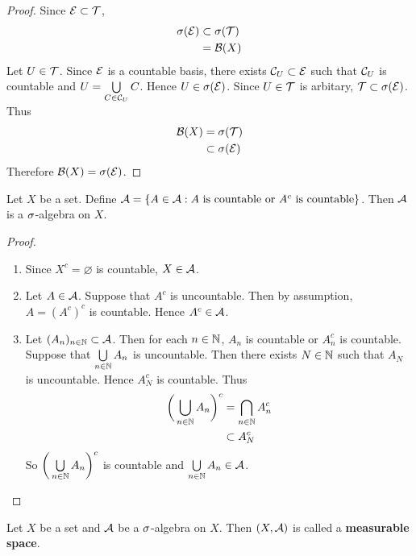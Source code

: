 \documentclass{book}
\begin{document}
	\begin{proof}
		Since $\mathcal{E} \subset \mathcal{T}$, 
		\begin{align*}
			\sigma(\mathcal{E})
			& \subset \sigma(\mathcal{T}) \\
			& = \mathcal{B}(X)
		\end{align*}
		Let $U \in \mathcal{T}$. Since $\mathcal{E}$ is a countable basis, there exists $\mathcal{C}_U \subset \mathcal{E}$ such that $\mathcal{C}_U$ is countable and $U = \bigcup\limits_{C \in \mathcal{C}_U}C$. Hence $U \in \sigma(\mathcal{E})$. Since $U \in \mathcal{T}$ is arbitary, $\mathcal{T} \subset \sigma(\mathcal{E})$. Thus 
		\begin{align*}
			\mathcal{B}(X) 
			& = \sigma(\mathcal{T}) \\
			& \subset \sigma(\mathcal{E})
		\end{align*} 
		Therefore $\mathcal{B}(X) = \sigma(\mathcal{E})$.
	\end{proof}
	
	\begin{ex}  
		Let $X$ be a set. Define $\mathcal{A} = \{A \in \mathcal{A}: A \text{ is countable or }A^c  \text{ is countable}\}$. Then $\mathcal{A}$ is a $\sigma$-algebra on $X$.
	\end{ex}
	
	\begin{proof}\
		\begin{enumerate}
			\item Since $X^c = \varnothing$ is countable, $X \in \mathcal{A}$.
			\item Let $A \in \mathcal{A}$. Suppose that $A^c$ is  uncountable. Then by assumption, $A = (A^c)^c$ is countable. Hence $A^c \in \mathcal{A}$.
			\item Let $(A_n)_{n \in \mathbb{N}} \subset \mathcal{A}$. Then for each $n \in \mathbb{N}$, $A_n$ is countable or $A_n^c$ is countable. Suppose that $\bigcup\limits_{n \in \mathbb{N}}A_n$ is uncountable. Then there exists $N \in \mathbb{N}$ such that $A_N$ is uncountable. Hence $A_N^c$ is countable. Thus 
			\begin{align*}
				\bigg(\bigcup_{n \in \mathbb{N}}A_n \bigg)^c 
				&= \bigcap_{n \in \mathbb{N}}A_n^c \\
				& \subset A_N^c 
			\end{align*}
			So $\bigg(\bigcup\limits_{n \in \mathbb{N}}A_n \bigg)^c $ is countable and $\bigcup\limits_{n \in \mathbb{N}}A_n \in \mathcal{A}$. 
		\end{enumerate}
	\end{proof}


	\begin{defn}  
		Let $X$ be a set and $\mathcal{A}$ be a $\sigma$-algebra on $X$. Then $(X, \mathcal{A})$ is called a \textbf{measurable space}.
	\end{defn}
\end{document}

